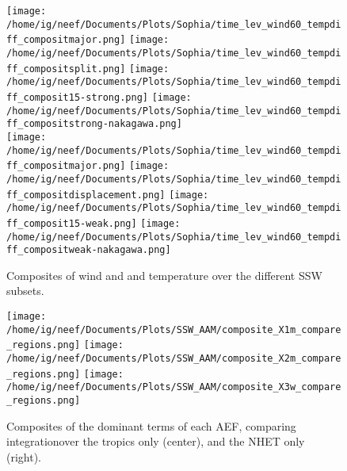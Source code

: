 \documentclass[11pt]{article}
\begin{document}
\begin{landscape}
\begin{figure}
  \noindent
  \texttt{[image: /home/ig/neef/Documents/Plots/Sophia/time\_lev\_wind60\_tempdiff\_compositmajor.png]}
  \texttt{[image: /home/ig/neef/Documents/Plots/Sophia/time\_lev\_wind60\_tempdiff\_compositsplit.png]}
  \texttt{[image: /home/ig/neef/Documents/Plots/Sophia/time\_lev\_wind60\_tempdiff\_composit15-strong.png]}
  \texttt{[image: /home/ig/neef/Documents/Plots/Sophia/time\_lev\_wind60\_tempdiff\_compositstrong-nakagawa.png]} \\
  \texttt{[image: /home/ig/neef/Documents/Plots/Sophia/time\_lev\_wind60\_tempdiff\_compositmajor.png]}
  \texttt{[image: /home/ig/neef/Documents/Plots/Sophia/time\_lev\_wind60\_tempdiff\_compositdisplacement.png]}
  \texttt{[image: /home/ig/neef/Documents/Plots/Sophia/time\_lev\_wind60\_tempdiff\_composit15-weak.png]}
  \texttt{[image: /home/ig/neef/Documents/Plots/Sophia/time\_lev\_wind60\_tempdiff\_compositweak-nakagawa.png]} \\
  \caption{Composites of wind and and temperature over the different SSW subsets.}
  \label{fig:compare_wind_composites}
 \end{figure}

\end{landscape}


\begin{figure}
  \noindent
  \texttt{[image: /home/ig/neef/Documents/Plots/SSW\_AAM/composite\_X1m\_compare\_regions.png]}
  \texttt{[image: /home/ig/neef/Documents/Plots/SSW\_AAM/composite\_X2m\_compare\_regions.png]}
  \texttt{[image: /home/ig/neef/Documents/Plots/SSW\_AAM/composite\_X3w\_compare\_regions.png]}
  \caption{Composites of the dominant terms of each AEF, comparing integrationover the tropics only (center), and the NHET only (right).}
 \label{fig:compare_regions}
\end{figure}





\end{document}
